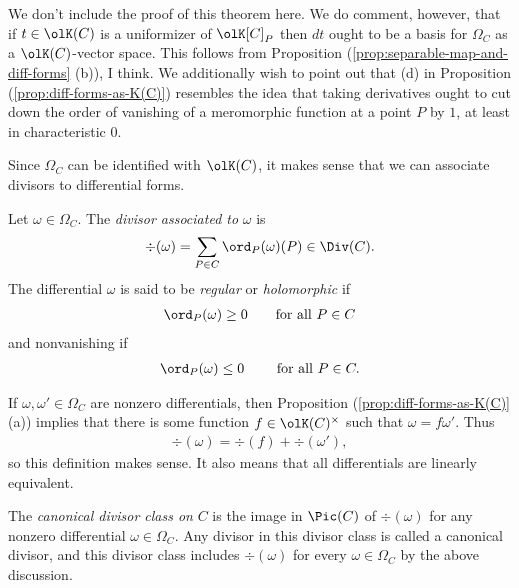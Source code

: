 We don't include the proof of this theorem here. We do comment, however, that if $t \in \olK(C)$ is a uniformizer of $\olK[C]_P$ then $dt$ ought to be a basis for $\Omega_C$ as a $\olK(C)$-vector space. This follows from Proposition (\ref{prop:separable-map-and-diff-forms} (b)), I think. We additionally wish to point out that (d) in Proposition (\ref{prop:diff-forms-as-K(C)}) resembles the idea that taking derivatives ought to cut down the order of vanishing of a meromorphic function at a point $P$ by $1$, at least in characteristic 0.

Since $\Omega_C$ can be identified with $\olK(C)$, it makes sense that we can associate divisors to differential forms.

\begin{defn}\label{defn:divisor-of-diff-form}
	Let $\omega \in \Omega_C$. The \emph{divisor associated to } $\omega$ is
	\begin{align*}
		\div(\omega) = \sum_{P \in C} \ord_P(\omega)(P) \in \Div(C).
	\end{align*}
	The differential $\omega$ is said to be \emph{regular} or \emph{holomorphic} if
	\begin{align*}
		\ord_P(\omega) \geq 0 \hspace{2em} \text{for all } P\in C
	\end{align*}
	and nonvanishing if
	\begin{align*}
		\ord_P(\omega) \leq 0 \hspace{2em} \text{ for all } P\in C.
	\end{align*}
\end{defn}
If $\omega, \omega' \in \Omega_C$ are nonzero differentials, then Proposition (\ref{prop:diff-forms-as-K(C)} (a)) implies that there is some function $f \in \olK(C)^\times$ such that $\omega = f\omega'$. Thus
\begin{align*}
	\div(\omega) = \div(f) + \div(\omega'),
\end{align*}
so this definition makes sense. It also means that all differentials are linearly equivalent.

\begin{defn}\label{defn:canonical-divisor}
	The \emph{canonical divisor class on} $C$ is the image in $\Pic(C)$ of $\div(\omega)$ for any nonzero differential $\omega \in \Omega_C$. Any divisor in this divisor class is called a canonical divisor, and this divisor class includes $\div(\omega)$ for every $\omega \in \Omega_C$ by the above discussion.
\end{defn}


